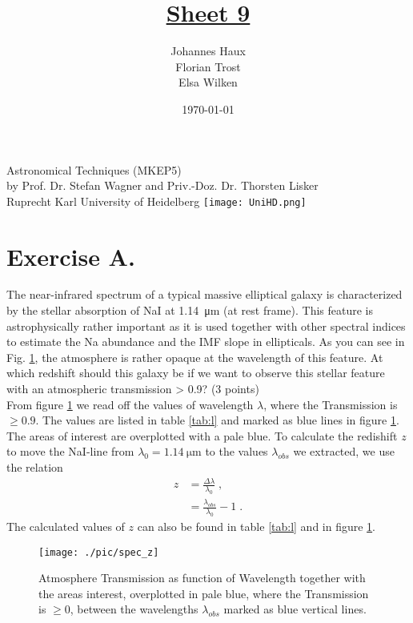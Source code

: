 \documentclass[11pt,a4paper,twoside]{article}
\title{\LARGE \underline {Sheet 9}}
\author{Johannes Haux \\ Florian Trost \\ Elsa Wilken}
\date{\today}
\begin{document}
\maketitle
\thispagestyle{empty}

\begin{center}
  Astronomical Techniques (MKEP5) \\
  \baselineskip35pt
  by Prof. Dr. Stefan Wagner and Priv.-Doz. Dr. Thorsten Lisker \\
  \baselineskip60pt
  Ruprecht Karl University of Heidelberg
\vskip 40pt
\texttt{[image: UniHD.png]}

\end{center}

\newpage
\setcounter{page}{1}		%

\section*{Exercise A.}

The near-infrared spectrum of a typical massive elliptical galaxy is
characterized by the stellar absorption of NaI at \SI{1.14}{\micro\meter} (at
rest frame). This feature is astrophysically rather important as it is used
together with other spectral indices to estimate the Na abundance and the IMF
slope in ellipticals.  As you can see in Fig. \ref{fig:z}, the atmosphere is
rather opaque at the wavelength of this feature. At which redshift should this
galaxy be if we want to observe this stellar feature with an atmospheric
transmission > 0.9? (3 points)\\

From figure \ref{fig:z} we read off the values of wavelength $\lambda$, where
the Transmission is $\geq 0.9$. The values are listed in table \ref{tab:l} and
marked as blue lines in figure \ref{fig:z}. The areas of interest are
overplotted with a pale blue. To calculate the redishift $z$ to move the
NaI-line from $\lambda_0=\SI{1.14}{\micro\meter}$ to the values $\lambda_{obs}$
we extracted, we use the relation
\begin{align*}
    z   &= \frac{\Delta \lambda}{\lambda_0}\;, \\
        &= \frac{\lambda_{obs}}{\lambda_0} -1\;.
\end{align*}
The calculated values of $z$ can also be found in table \ref{tab:l} and in 
figure \ref{fig:z}.

\begin{figure}[h!]
\centering
\texttt{[image: ./pic/spec\_z]}
\caption{Atmosphere Transmission as function of Wavelength together with the
         areas interest, overplotted in pale blue, where the Transmission is
         $\geq 0$, between the wavelengths $\lambda_{obs}$ marked as blue
         vertical lines.}
\label{fig:z}
\end{figure}
\end{document}
